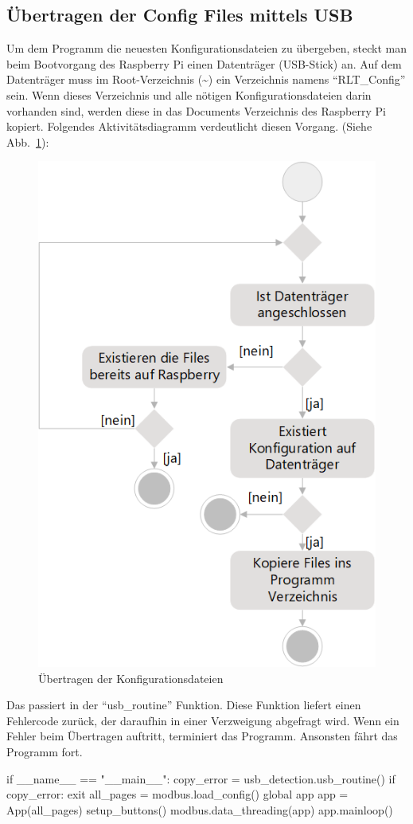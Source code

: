 \subsection{Übertragen der Config Files mittels USB}
Um dem Programm die neuesten Konfigurationsdateien zu übergeben, steckt man beim Bootvorgang des Raspberry Pi einen Datenträger (\zB USB-Stick) an. Auf dem Datenträger muss im Root-Verzeichnis (\textasciitilde) ein Verzeichnis namens \enquote{RLT\_Config} sein. Wenn dieses Verzeichnis und alle nötigen Konfigurationsdateien darin vorhanden sind, werden diese in das Documents Verzeichnis des Raspberry Pi kopiert. \newline Folgendes Aktivitätsdiagramm verdeutlicht diesen Vorgang. (Siehe Abb.~\ref{fig:config_ubertragen_activity}):
\begin{figure}[H]
	\centering
	\includegraphics[width=0.4\linewidth]{Bilder/config_ubertragen_activity_diagram}
	\caption{Übertragen der Konfigurationsdateien}
	\label{fig:config_ubertragen_activity}
\end{figure}


Das passiert in der \enquote{usb\_routine} Funktion. Diese Funktion liefert einen Fehlercode zurück, der daraufhin in einer Verzweigung abgefragt wird. Wenn ein Fehler beim Übertragen auftritt, terminiert das Programm. Ansonsten fährt das Programm fort.

\begin{pythoncode}
if __name__ == "__main__":
	copy_error = usb_detection.usb_routine()
	if copy_error:
		exit
	all_pages = modbus.load_config()
	global app
	app = App(all_pages)
	setup_buttons()
	modbus.data_threading(app)
	app.mainloop()	
\end{pythoncode}

